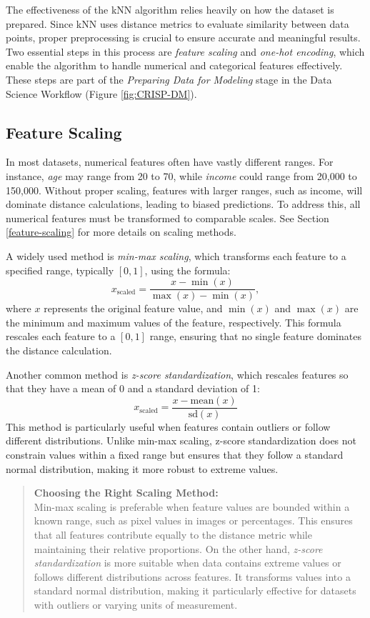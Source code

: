 \documentclass[
  11pt,
]{book}
\theoremstyle{definition}
\theoremstyle{definition}
\theoremstyle{definition}
\theoremstyle{definition}
\theoremstyle{remark}
\begin{document}
The effectiveness of the kNN algorithm relies heavily on how the dataset is prepared. Since kNN uses distance metrics to evaluate similarity between data points, proper preprocessing is crucial to ensure accurate and meaningful results. Two essential steps in this process are \emph{feature scaling} and \emph{one-hot encoding}, which enable the algorithm to handle numerical and categorical features effectively. These steps are part of the \emph{Preparing Data for Modeling} stage in the Data Science Workflow (Figure \ref{fig:CRISP-DM}).

\subsection{Feature Scaling}\label{feature-scaling-1}

In most datasets, numerical features often have vastly different ranges. For instance, \emph{age} may range from 20 to 70, while \emph{income} could range from 20,000 to 150,000. Without proper scaling, features with larger ranges, such as income, will dominate distance calculations, leading to biased predictions. To address this, all numerical features must be transformed to comparable scales. See Section \ref{feature-scaling} for more details on scaling methods.

A widely used method is \emph{min-max scaling}, which transforms each feature to a specified range, typically \([0, 1]\), using the formula:
\[
x_{\text{scaled}} = \frac{x - \min(x)}{\max(x) - \min(x)},
\]
where \(x\) represents the original feature value, and \(\min(x)\) and \(\max(x)\) are the minimum and maximum values of the feature, respectively. This formula rescales each feature to a \([0,1]\) range, ensuring that no single feature dominates the distance calculation.

Another common method is \emph{z-score standardization}, which rescales features so that they have a mean of 0 and a standard deviation of 1:
\[
x_{\text{scaled}} = \frac{x - \text{mean}(x)}{\text{sd}(x)}
\]
This method is particularly useful when features contain outliers or follow different distributions. Unlike min-max scaling, z-score standardization does not constrain values within a fixed range but ensures that they follow a standard normal distribution, making it more robust to extreme values.

\begin{quote}
\textbf{Choosing the Right Scaling Method:}\\
Min-max scaling is preferable when feature values are bounded within a known range, such as pixel values in images or percentages. This ensures that all features contribute equally to the distance metric while maintaining their relative proportions. On the other hand, \emph{z-score standardization} is more suitable when data contains extreme values or follows different distributions across features. It transforms values into a standard normal distribution, making it particularly effective for datasets with outliers or varying units of measurement.
\end{quote}
\end{document}
